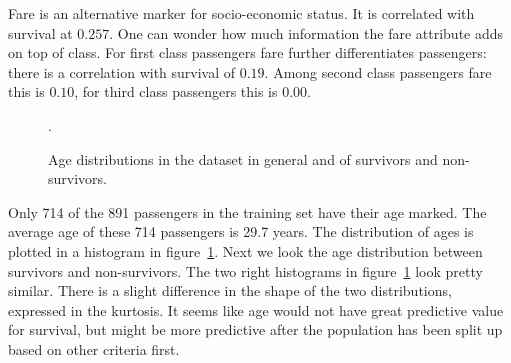 \documentclass{llncs}
\begin{document}
Fare is an alternative marker for socio-economic status. It is correlated with survival at $0.257$. One can wonder how much information the fare attribute adds on top of class. For first class passengers fare further differentiates passengers: there is a correlation with survival of $0.19$. Among second class passengers fare this is $0.10$, for third class passengers this is $0.00$.\\
\begin{figure}[]
    \centering
    \hfill
    \hfill
    \caption{Age distributions in the dataset in general and of survivors and non-survivors.}
    \label{fig:age_histogram}.
\end{figure}
\noindent
Only 714 of the 891 passengers in the training set have their age marked. The average age of these 714 passengers is 29.7 years. The distribution of ages is plotted in a histogram in figure~\ref{fig:age_histogram}. Next we look the age distribution between survivors and non-survivors. The two right histograms in figure~\ref{fig:age_histogram} look pretty similar. There is a slight difference in the shape of the two distributions, expressed in the kurtosis.  It seems like age would not have great predictive value for survival, but might be more predictive after the population has been split up based on other criteria first.\\
\end{document}
